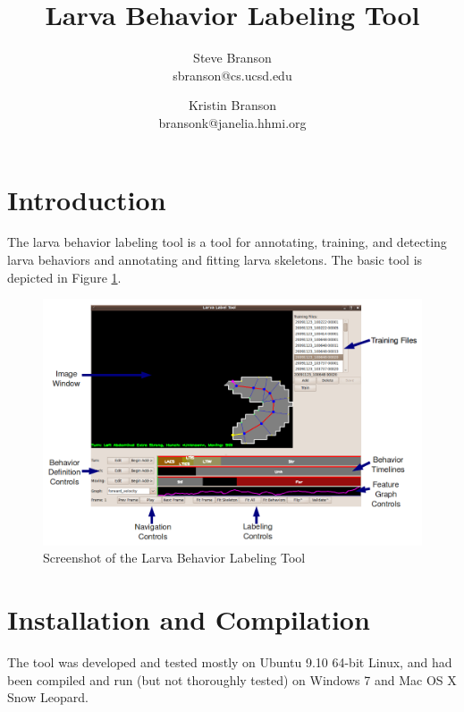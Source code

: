 \documentclass[10pt, onecolumn]{article}
\title{Larva Behavior Labeling Tool}
\author{Steve Branson\\sbranson@cs.ucsd.edu 
\and Kristin Branson\\bransonk@janelia.hhmi.org}
\newcommand{\1}{\textbf{1}}
\begin{document}
\maketitle

\section{Introduction}

The larva behavior labeling tool is a tool for annotating, training, and detecting larva behaviors and annotating and fitting larva skeletons.  The basic tool is depicted in Figure \ref{fig:screenshot}.

\begin{figure}[t]
\centering
\includegraphics[width=17.0cm]{Screenshot.png}
\caption{Screenshot of the Larva Behavior Labeling Tool}
\label{fig:screenshot}
\end{figure}

\section{Installation and Compilation}

The tool was developed and tested mostly on Ubuntu 9.10 64-bit Linux, and had been compiled and run (but not thoroughly tested) on Windows 7 and Mac OS X Snow Leopard.  
\end{document}

